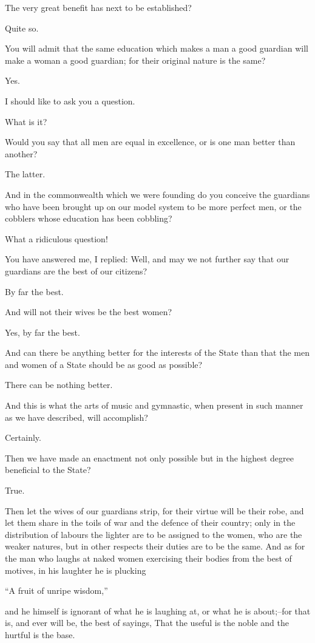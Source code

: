 The very great benefit has next to be established?

Quite so.

You will admit that the same education which makes a man a good guardian
will make a woman a good guardian; for their original nature is the
same?

Yes.

I should like to ask you a question.

What is it?

Would you say that all men are equal in excellence, or is one man better
than another?

The latter.

And in the commonwealth which we were founding do you conceive the
guardians who have been brought up on our model system to be more
perfect men, or the cobblers whose education has been cobbling?

What a ridiculous question!

You have answered me, I replied: Well, and may we not further say that
our guardians are the best of our citizens?

By far the best.

And will not their wives be the best women?

Yes, by far the best.

And can there be anything better for the interests of the State than
that the men and women of a State should be as good as possible?

There can be nothing better.

And this is what the arts of music and gymnastic, when present in such
manner as we have described, will accomplish?

Certainly.

Then we have made an enactment not only possible but in the highest
degree beneficial to the State?

True.

Then let the wives of our guardians strip, for their virtue will be
their robe, and let them share in the toils of war and the defence of
their country; only in the distribution of labours the lighter are to be
assigned to the women, who are the weaker natures, but in other respects
their duties are to be the same. And as for the man who laughs at naked
women exercising their bodies from the best of motives, in his laughter
he is plucking

``A fruit of unripe wisdom,''

and he himself is ignorant of what he is laughing at, or what he is
about;--for that is, and ever will be, the best of sayings, That the
useful is the noble and the hurtful is the base.

